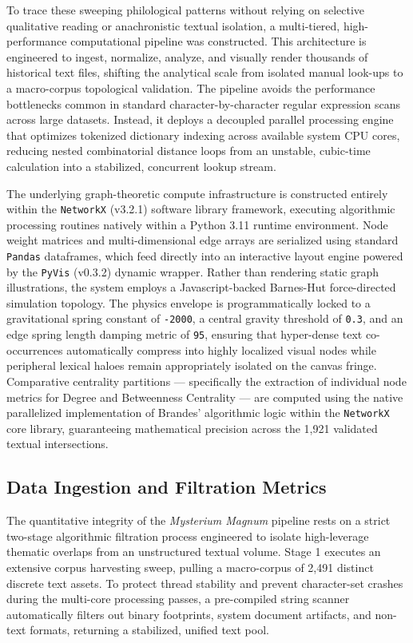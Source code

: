 \documentclass[11pt,twoside,a4paper]{article}
\begin{document}
To trace these sweeping philological patterns without relying on selective qualitative reading or anachronistic textual isolation, a multi-tiered, high-performance computational pipeline was constructed. This architecture is engineered to ingest, normalize, analyze, and visually render thousands of historical text files, shifting the analytical scale from isolated manual look-ups to a macro-corpus topological validation. The pipeline avoids the performance bottlenecks common in standard character-by-character regular expression scans across large datasets. Instead, it deploys a decoupled parallel processing engine that optimizes tokenized dictionary indexing across available system CPU cores, reducing nested combinatorial distance loops from an unstable, cubic-time calculation into a stabilized, concurrent lookup stream.

The underlying graph-theoretic compute infrastructure is constructed entirely within the \texttt{NetworkX} (v3.2.1) software library framework, executing algorithmic processing routines natively within a Python 3.11 runtime environment. Node weight matrices and multi-dimensional edge arrays are serialized using standard \texttt{Pandas} dataframes, which feed directly into an interactive layout engine powered by the \texttt{PyVis} (v0.3.2) dynamic wrapper. Rather than rendering static graph illustrations, the system employs a Javascript-backed Barnes-Hut force-directed simulation topology. The physics envelope is programmatically locked to a gravitational spring constant of \texttt{-2000}, a central gravity threshold of \texttt{0.3}, and an edge spring length damping metric of \texttt{95}, ensuring that hyper-dense text co-occurrences automatically compress into highly localized visual nodes while peripheral lexical haloes remain appropriately isolated on the canvas fringe. Comparative centrality partitions — specifically the extraction of individual node metrics for Degree and Betweenness Centrality — are computed using the native parallelized implementation of Brandes’ algorithmic logic within the \texttt{NetworkX} core library, guaranteeing mathematical precision across the 1,921 validated textual intersections.

\subsection{Data Ingestion and Filtration Metrics}
The quantitative integrity of the \textit{Mysterium Magnum} pipeline rests on a strict two-stage algorithmic filtration process engineered to isolate high-leverage thematic overlaps from an unstructured textual volume. Stage 1 executes an extensive corpus harvesting sweep, pulling a macro-corpus of 2,491 distinct discrete text assets. To protect thread stability and prevent character-set crashes during the multi-core processing passes, a pre-compiled string scanner automatically filters out binary footprints, system document artifacts, and non-text formats, returning a stabilized, unified text pool.
\end{document}
